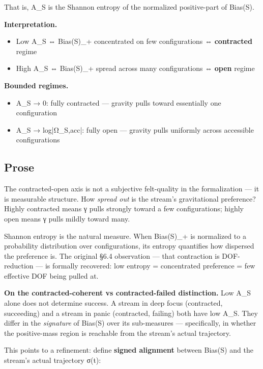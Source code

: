 \documentclass[11pt, openany]{book}
\begin{document}
That is, A\_\allowbreak{}S is the Shannon entropy of the normalized positive-part of Bias(S).

\textbf{Interpretation.}
\begin{itemize}
\item Low A\_\allowbreak{}S ⇔ Bias(S)\_\allowbreak{}+ concentrated on few configurations ⇔ \textbf{contracted} regime
\item High A\_\allowbreak{}S ⇔ Bias(S)\_\allowbreak{}+ spread across many configurations ⇔ \textbf{open} regime
\end{itemize}

\textbf{Bounded regimes.}
\begin{itemize}
\item A\_\allowbreak{}S → 0: fully contracted --- gravity pulls toward essentially one configuration
\item A\_\allowbreak{}S → log|Ω\_\allowbreak{}S,acc|: fully open --- gravity pulls uniformly across accessible configurations
\end{itemize}

\subsection{Prose}

The contracted-open axis is not a subjective felt-quality in the formalization --- it is measurable structure. How \textit{spread out} is the stream's gravitational preference? Highly contracted means γ pulls strongly toward a few configurations; highly open means γ pulls mildly toward many.

Shannon entropy is the natural measure. When Bias(S)\_\allowbreak{}+ is normalized to a probability distribution over configurations, its entropy quantifies how dispersed the preference is. The original §6.4 observation --- that contraction is DOF-reduction --- is formally recovered: low entropy = concentrated preference = few effective DOF being pulled at.

\textbf{On the contracted-coherent vs contracted-failed distinction.} Low A\_\allowbreak{}S alone does not determine success. A stream in deep focus (contracted, succeeding) and a stream in panic (contracted, failing) both have low A\_\allowbreak{}S. They differ in the \textit{signature} of Bias(S) over its sub-measures --- specifically, in whether the positive-mass region is reachable from the stream's actual trajectory.

This points to a refinement: define \textbf{signed alignment} between Bias(S) and the stream's actual trajectory σ(t):
\end{document}
